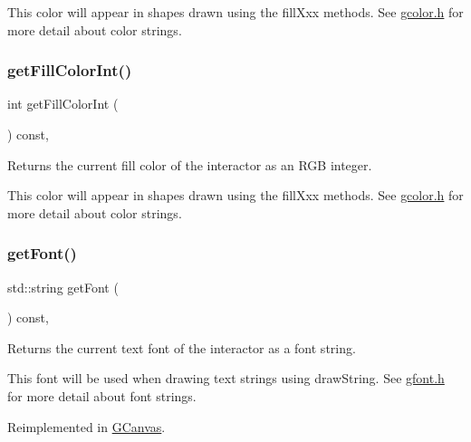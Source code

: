 This color will appear in shapes drawn using the fill\+Xxx methods. See \mbox{\hyperlink{gcolor_8h_source}{gcolor.\+h}} for more detail about color strings. \mbox{\label{classsgl_1_1GDrawingSurface_a88f4508d9271c4b5f5b5d6b780f223d0}} 
\subsubsection{\texorpdfstring{get\+Fill\+Color\+Int()}{getFillColorInt()}}
{\footnotesize\ttfamily int get\+Fill\+Color\+Int (\begin{DoxyParamCaption}{ }\end{DoxyParamCaption}) const\hspace{0.3cm}{\ttfamily [virtual]}, {\ttfamily [inherited]}}



Returns the current fill color of the interactor as an R\+GB integer. 

This color will appear in shapes drawn using the fill\+Xxx methods. See \mbox{\hyperlink{gcolor_8h_source}{gcolor.\+h}} for more detail about color strings. \mbox{\label{classsgl_1_1GDrawingSurface_a894a5502900794eeb27d084c21f1d77d}} 
\subsubsection{\texorpdfstring{get\+Font()}{getFont()}}
{\footnotesize\ttfamily std\+::string get\+Font (\begin{DoxyParamCaption}{ }\end{DoxyParamCaption}) const\hspace{0.3cm}{\ttfamily [virtual]}, {\ttfamily [inherited]}}



Returns the current text font of the interactor as a font string. 

This font will be used when drawing text strings using draw\+String. See \mbox{\hyperlink{gfont_8h_source}{gfont.\+h}} for more detail about font strings. 

Reimplemented in \mbox{\hyperlink{classsgl_1_1GCanvas_aa0829769ac6325b5c58d27c8e363cb78}{G\+Canvas}}.


